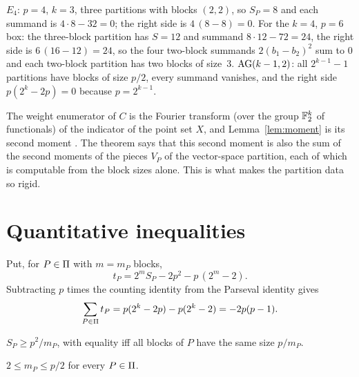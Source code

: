 
\begin{example}[Checks]\label{ex:parseval}
$E_4$: $p=4$, $k=3$, three partitions with blocks $(2,2)$, so $S_P=8$ and each summand is $4\cdot8-32=0$; the right side is $4\,(8-8)=0$. For the $k=4$, $p=6$ box: the three-block partition has $S=12$ and summand $8\cdot12-72=24$, the right side is $6\,(16-12)=24$, so the four two-block summands $2(b_1-b_2)^2$ sum to $0$ and each two-block partition has two blocks of size~$3$. $\mathrm{AG}(k-1,2)$: all $2^{k-1}-1$ partitions have blocks of size $p/2$, every summand vanishes, and the right side $p(2^k-2p)=0$ because $p=2^{k-1}$.
\end{example}

\begin{remark}\label{rem:fourier}
The weight enumerator of $C$ is the Fourier transform (over the group $\mathbb F_2^k$ of functionals) of the indicator of the point set $X$, and Lemma~\ref{lem:moment} is its second moment \cite{Terras1999,ODonnell2014}. The theorem says that this second moment is also the sum of the second moments of the pieces $V_P$ of the vector-space partition, each of which is computable from the block sizes alone. This is what makes the partition data so rigid.
\end{remark}

\section{Quantitative inequalities}\label{sec:ineq}

Put, for $P\in\Pi$ with $m=m_P$ blocks,
\[
t_P=2^{m}S_P-2p^2-p\,(2^{m}-2).
\]
Subtracting $p$ times the counting identity from the Parseval identity gives
\begin{equation}\label{eq:tsum}
\sum_{P\in\Pi}t_P=p(2^k-2p)-p(2^k-2)=-2p(p-1).
\end{equation}

\begin{lemma}\label{lem:CS}
$S_P\ge p^2/m_P$, with equality iff all blocks of $P$ have the same size $p/m_P$.
\end{lemma}

\begin{lemma}\label{lem:mbound}
$2\le m_P\le p/2$ for every $P\in\Pi$.
\end{lemma}

